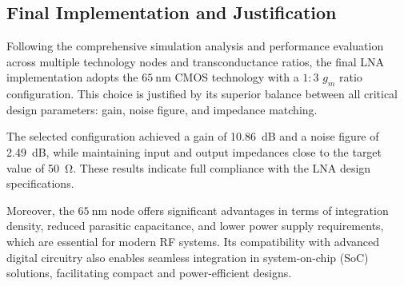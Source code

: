 \subsection{Final Implementation and Justification}

Following the comprehensive simulation analysis and performance evaluation across multiple technology nodes and transconductance ratios, the final LNA implementation adopts the $\SI{65}{\nano \meter}$ CMOS technology with a $1{:}3$ $g_m$ ratio configuration. This choice is justified by its superior balance between all critical design parameters: gain, noise figure, and impedance matching.

The selected configuration achieved a gain of 10.86~dB and a noise figure of 2.49~dB, while maintaining input and output impedances close to the target value of \SI{50}{\ohm}. These results indicate full compliance with the LNA design specifications.

Moreover, the $\SI{65}{\nano \meter}$ node offers significant advantages in terms of integration density, reduced parasitic capacitance, and lower power supply requirements, which are essential for modern RF systems. Its compatibility with advanced digital circuitry also enables seamless integration in system-on-chip (SoC) solutions, facilitating compact and power-efficient designs.


